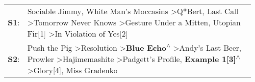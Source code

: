 \begin{supertabular}{p{0.03\textwidth}p{0.92\textwidth}}
 \textbf{S1}:  &                                                                                                           Sociable Jimmy\textsuperscript{}, \enspace White Man's Moccasins\textsuperscript{} \textgreater \enspace Q*Bert\textsuperscript{}, \enspace Last Call\textsuperscript{} \textgreater \enspace Tomorrow Never Knows\textsuperscript{} \textgreater \enspace Gesture Under a Mitten\textsuperscript{}, \enspace Utopian Fir[1]\textsuperscript{} \textgreater \enspace In Violation of Yes[2]\textsuperscript{}  \enspace  \\
 \textbf{S2}:  &  Push the Pig\textsuperscript{} \textgreater \enspace Resolution\textsuperscript{} \textgreater \enspace \textbf{Blue Echo\textsuperscript{$\wedge$}} \textgreater \enspace Andy's Last Beer\textsuperscript{}, \enspace Prowler\textsuperscript{} \textgreater \enspace Hajimemashite\textsuperscript{} \textgreater \enspace Padgett's Profile\textsuperscript{}, \enspace \textbf{Example 1[3]\textsuperscript{$\wedge$}} \textgreater \enspace Glory[4]\textsuperscript{}, \enspace Miss Gradenko\textsuperscript{}  \enspace  \\
\end{supertabular}
